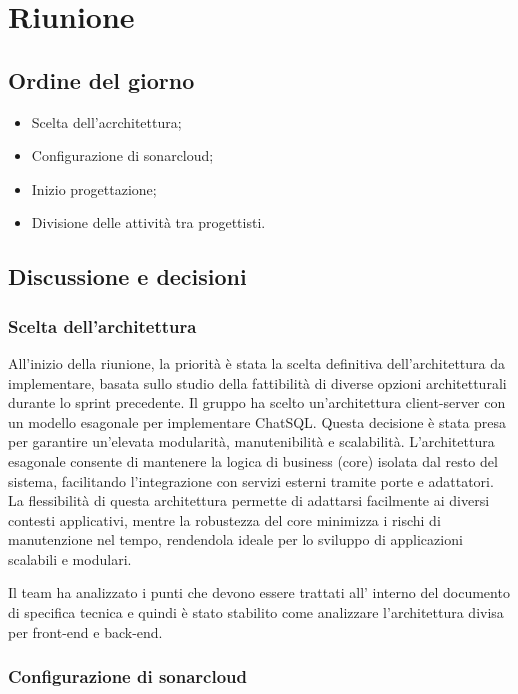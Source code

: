 \section{Riunione}
\subsection{Ordine del giorno}
\begin{itemize}
	\item Scelta dell'acrchitettura;
	\item Configurazione di sonarcloud;
	\item Inizio progettazione;
	\item Divisione delle attività tra progettisti.
\end{itemize}

\subsection{Discussione e decisioni}
\subsubsection{Scelta dell'architettura}
\par All'inizio della riunione, la priorità è stata la scelta definitiva dell'architettura da implementare, basata sullo studio della fattibilità di diverse opzioni architetturali durante lo sprint precedente. Il gruppo ha scelto un'architettura client-server con un modello esagonale per implementare ChatSQL. Questa decisione è stata presa per garantire un'elevata modularità, manutenibilità e scalabilità. L'architettura esagonale consente di mantenere la logica di business (core) isolata dal resto del sistema, facilitando l'integrazione con servizi esterni tramite porte e adattatori. La flessibilità di questa architettura permette di adattarsi facilmente ai diversi contesti applicativi, mentre la robustezza del core minimizza i rischi di manutenzione nel tempo, rendendola ideale per lo sviluppo di applicazioni scalabili e modulari.

\par Il team ha analizzato i punti che devono essere trattati all' interno del documento di specifica tecnica e quindi è stato stabilito come analizzare l'architettura divisa per front-end e back-end.

\subsubsection{Configurazione di sonarcloud}

